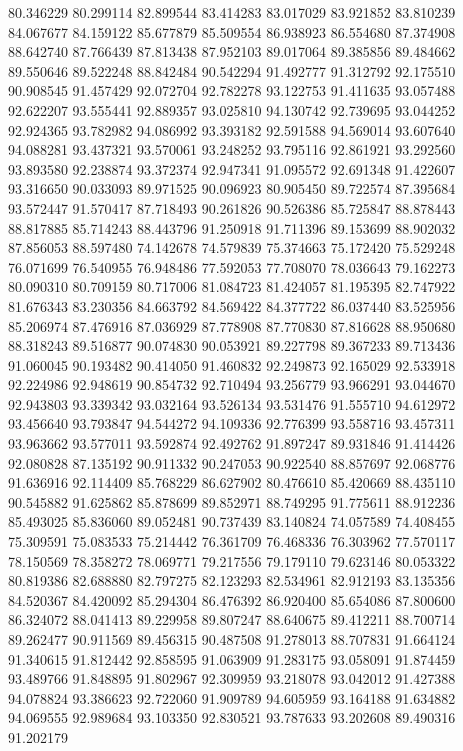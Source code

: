 80.346229
80.299114
82.899544
83.414283
83.017029
83.921852
83.810239
84.067677
84.159122
85.677879
85.509554
86.938923
86.554680
87.374908
88.642740
87.766439
87.813438
87.952103
89.017064
89.385856
89.484662
89.550646
89.522248
88.842484
90.542294
91.492777
91.312792
92.175510
90.908545
91.457429
92.072704
92.782278
93.122753
91.411635
93.057488
92.622207
93.555441
92.889357
93.025810
94.130742
92.739695
93.044252
92.924365
93.782982
94.086992
93.393182
92.591588
94.569014
93.607640
94.088281
93.437321
93.570061
93.248252
93.795116
92.861921
93.292560
93.893580
92.238874
93.372374
92.947341
91.095572
92.691348
91.422607
93.316650
90.033093
89.971525
90.096923
80.905450
89.722574
87.395684
93.572447
91.570417
87.718493
90.261826
90.526386
85.725847
88.878443
88.817885
85.714243
88.443796
91.250918
91.711396
89.153699
88.902032
87.856053
88.597480
74.142678
74.579839
75.374663
75.172420
75.529248
76.071699
76.540955
76.948486
77.592053
77.708070
78.036643
79.162273
80.090310
80.709159
80.717006
81.084723
81.424057
81.195395
82.747922
81.676343
83.230356
84.663792
84.569422
84.377722
86.037440
83.525956
85.206974
87.476916
87.036929
87.778908
87.770830
87.816628
88.950680
88.318243
89.516877
90.074830
90.053921
89.227798
89.367233
89.713436
91.060045
90.193482
90.414050
91.460832
92.249873
92.165029
92.533918
92.224986
92.948619
90.854732
92.710494
93.256779
93.966291
93.044670
92.943803
93.339342
93.032164
93.526134
93.531476
91.555710
94.612972
93.456640
93.793847
94.544272
94.109336
92.776399
93.558716
93.457311
93.963662
93.577011
93.592874
92.492762
91.897247
89.931846
91.414426
92.080828
87.135192
90.911332
90.247053
90.922540
88.857697
92.068776
91.636916
92.114409
85.768229
86.627902
80.476610
85.420669
88.435110
90.545882
91.625862
85.878699
89.852971
88.749295
91.775611
88.912236
85.493025
85.836060
89.052481
90.737439
83.140824
74.057589
74.408455
75.309591
75.083533
75.214442
76.361709
76.468336
76.303962
77.570117
78.150569
78.358272
78.069771
79.217556
79.179110
79.623146
80.053322
80.819386
82.688880
82.797275
82.123293
82.534961
82.912193
83.135356
84.520367
84.420092
85.294304
86.476392
86.920400
85.654086
87.800600
86.324072
88.041413
89.229958
89.807247
88.640675
89.412211
88.700714
89.262477
90.911569
89.456315
90.487508
91.278013
88.707831
91.664124
91.340615
91.812442
92.858595
91.063909
91.283175
93.058091
91.874459
93.489766
91.848895
91.802967
92.309959
93.218078
93.042012
91.427388
94.078824
93.386623
92.722060
91.909789
94.605959
93.164188
91.634882
94.069555
92.989684
93.103350
92.830521
93.787633
93.202608
89.490316
91.202179
